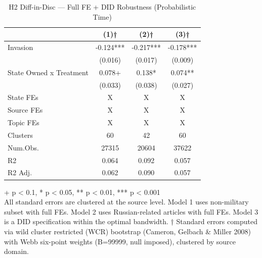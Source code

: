 \begin{table}[t]
\caption{\label{tab:table-s04}H2 Diff-in-Disc — Full FE + DID Robustness (Probabilistic Time)}
\fontsize{12.0pt}{14.0pt}\selectfont
\begin{tabular*}{\linewidth}{@{\extracolsep{\fill}}lccc}
\toprule
  & (1)† & (2)† & (3)† \\ 
\midrule\addlinespace[2.5pt]
Invasion & -0.124*** & -0.217*** & -0.178*** \\ 
 & (0.016) & (0.017) & (0.009) \\ 
State Owned x Treatment & 0.078+ & 0.138* & 0.074** \\ 
{} & {(0.033)} & {(0.038)} & {(0.027)} \\ 
State FEs & X & X & X \\ 
Source FEs & X & X & X \\ 
Topic FEs & X & X & X \\ 
Clusters & 60 & 42 & 60 \\ 
Num.Obs. & 27315 & 20604 & 37622 \\ 
R2 & 0.064 & 0.092 & 0.057 \\ 
R2 Adj. & 0.062 & 0.090 & 0.057 \\ 
\bottomrule
\end{tabular*}
\begin{minipage}{\linewidth}
\vspace{.05em}
+ p < 0.1, * p < 0.05, ** p < 0.01, *** p < 0.001\\
All standard errors are clustered at the source level. Model 1 uses non-military
subset with full FEs. Model 2 uses Russian-related articles with full FEs.
Model 3 is a DID specification within the optimal bandwidth. † Standard errors
computed via wild cluster restricted (WCR) bootstrap (Cameron, Gelbach \& Miller
2008) with Webb six-point weights (B=99999, null imposed), clustered by source
domain.\\
\end{minipage}
\end{table}

